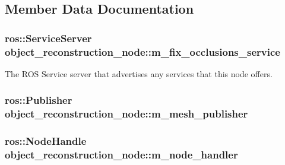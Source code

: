 \subsection{\-Member \-Data \-Documentation}
\hypertarget{classobject__reconstruction__node_a0beb4c4e79ee822d4ca5bb320eb8ddfd}{
\subsubsection[{m\-\_\-fix\-\_\-occlusions\-\_\-service}]{\setlength{\rightskip}{0pt plus 5cm}ros\-::\-Service\-Server {\bf object\-\_\-reconstruction\-\_\-node\-::m\-\_\-fix\-\_\-occlusions\-\_\-service}}}\label{classobject__reconstruction__node_a0beb4c4e79ee822d4ca5bb320eb8ddfd}


\-The \-R\-O\-S \-Service server that advertises any services that this node offers. 

\hypertarget{classobject__reconstruction__node_a6a72f63b7f73aea0f7b6c9f7cb058c82}{
\subsubsection[{m\-\_\-mesh\-\_\-publisher}]{\setlength{\rightskip}{0pt plus 5cm}ros\-::\-Publisher {\bf object\-\_\-reconstruction\-\_\-node\-::m\-\_\-mesh\-\_\-publisher}}}\label{classobject__reconstruction__node_a6a72f63b7f73aea0f7b6c9f7cb058c82}
\hypertarget{classobject__reconstruction__node_ac4c5d38f03eefaea752963d27555c222}{
\subsubsection[{m\-\_\-node\-\_\-handler}]{\setlength{\rightskip}{0pt plus 5cm}ros\-::\-Node\-Handle {\bf object\-\_\-reconstruction\-\_\-node\-::m\-\_\-node\-\_\-handler}}}\label{classobject__reconstruction__node_ac4c5d38f03eefaea752963d27555c222}


